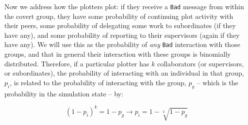 \documentclass{article}
\begin{document}
Now we address how the plotters plot: if they receive a \texttt{Bad} message from within the covert group, they have some probability of continuing plot activity with their peers, some probability of delegating some work to subordinates (if they have any), and some probability of reporting to their supervisors (again if they have any).  We will use this as the probability of {\em any} \texttt{Bad} interaction with those groups, and that in general their interaction with these groups is binomially distributed.  Therefore, if a particular plotter has $k$ collaborators (or supervisors, or subordinates), the probability of interacting with an individual in that group, $p_i$, is related to the probability of interacting with the group, $p_g$ -- which is the probability in the simulation state -- by:

$$
(1-p_i)^k = 1 - p_g \rightarrow p_i = 1-\sqrt[k]{1-p_g}
$$
\end{document}
